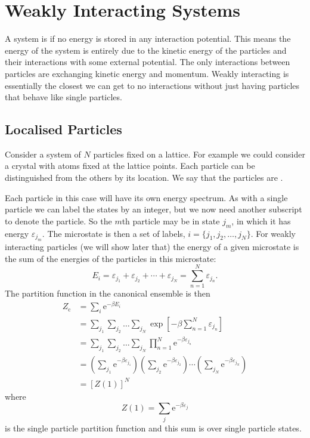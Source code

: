 \documentclass[fleqn]{NotesClass}
\newcommand*{\cpartition}{Z_{\mathrm{c}}}
\newcommand*{\e}{\mathrm{e}}
\begin{document}
    \chapter{Weakly Interacting Systems}
    A system is  if no energy is stored in any interaction potential.
    This means the energy of the system is entirely due to the kinetic energy of the particles and their interactions with some external potential.
    The only interactions between particles are exchanging kinetic energy and momentum.
    Weakly interacting is essentially the closest we can get to no interactions without just having particles that behave like single particles.
    
    \section{Localised Particles}
    Consider a system of \(N\) particles fixed on a lattice.
    For example we could consider a crystal with atoms fixed at the lattice points.
    Each particle can be distinguished from the others by its location.
    We say that the particles are .
    
    Each particle in this case will have its own energy spectrum.
    As with a single particle we can label the states by an integer, but we now need another subscript to denote the particle.
    So the \(m\)th particle may be in state \(j_m\), in which it has energy \(\varepsilon_{j_m}\).
    The microstate is then a set of labels, \(i = \{j_1, j_2, \dotsc, j_N\}\).
    For weakly interacting particles (we will show later that) the energy of a given microstate is the sum of the energies of the particles in this microstate:
    \begin{equation}
        E_i = \varepsilon_{j_1} + \varepsilon_{j_2} + \dotsb + \varepsilon_{j_N} = \sum_{n=1}^{N} \varepsilon_{j_n}.
    \end{equation}
    The partition function in the canonical ensemble is then
    \begin{align}
        \cpartition &= \sum_{i} \e^{-\beta E_i}\\
        &= \sum_{j_1}\sum_{j_2}\dotso\sum_{j_N} \exp\left[ -\beta \sum_{n=1}^{N} \varepsilon_{j_n} \right]\\
        &= \sum_{j_1}\sum_{j_2}\dotso\sum_{j_N} \prod_{n=1}^{N} \e^{-\beta\varepsilon_{j_n}}\\
        &= \left( \sum_{j_1} \e^{-\beta\varepsilon_{j_1}} \right)\left( \sum_{j_2} \e^{-\beta\varepsilon_{j_2}} \right) \dotsm \left( \sum_{j_N} \e^{-\beta\varepsilon_{j_N}} \right)\\
        &= [Z(1)]^N
    \end{align}
    where
    \begin{equation}
        Z(1) = \sum_{j} \e^{-\beta \varepsilon_j}
    \end{equation}
    is the single particle partition function and this sum is over single particle states.
    
\end{document}
